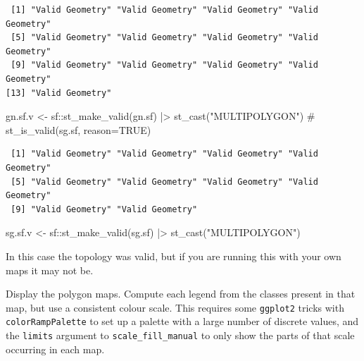 \documentclass[
  letterpaper,
  DIV=11,
  numbers=noendperiod]{scrartcl}
\newenvironment{Shaded}{\begin{snugshade}}{\end{snugshade}}
\newcommand{\AttributeTok}[1]{\textcolor[rgb]{0.40,0.45,0.13}{#1}}
\newcommand{\CommentTok}[1]{\textcolor[rgb]{0.37,0.37,0.37}{#1}}
\newcommand{\ConstantTok}[1]{\textcolor[rgb]{0.56,0.35,0.01}{#1}}
\newcommand{\FunctionTok}[1]{\textcolor[rgb]{0.28,0.35,0.67}{#1}}
\newcommand{\NormalTok}[1]{\textcolor[rgb]{0.00,0.23,0.31}{#1}}
\newcommand{\OtherTok}[1]{\textcolor[rgb]{0.00,0.23,0.31}{#1}}
\newcommand{\SpecialCharTok}[1]{\textcolor[rgb]{0.37,0.37,0.37}{#1}}
\newcommand{\StringTok}[1]{\textcolor[rgb]{0.13,0.47,0.30}{#1}}
\begin{document}
\begin{verbatim}
 [1] "Valid Geometry" "Valid Geometry" "Valid Geometry" "Valid Geometry"
 [5] "Valid Geometry" "Valid Geometry" "Valid Geometry" "Valid Geometry"
 [9] "Valid Geometry" "Valid Geometry" "Valid Geometry" "Valid Geometry"
[13] "Valid Geometry"
\end{verbatim}

\begin{Shaded}
\begin{Highlighting}[]
\NormalTok{gn.sf.v }\OtherTok{\textless{}{-}}\NormalTok{ sf}\SpecialCharTok{::}\FunctionTok{st\_make\_valid}\NormalTok{(gn.sf)  }\SpecialCharTok{|\textgreater{}} \FunctionTok{st\_cast}\NormalTok{(}\StringTok{"MULTIPOLYGON"}\NormalTok{)}
\CommentTok{\#}
\FunctionTok{st\_is\_valid}\NormalTok{(sg.sf, }\AttributeTok{reason=}\ConstantTok{TRUE}\NormalTok{)}
\end{Highlighting}
\end{Shaded}

\begin{verbatim}
 [1] "Valid Geometry" "Valid Geometry" "Valid Geometry" "Valid Geometry"
 [5] "Valid Geometry" "Valid Geometry" "Valid Geometry" "Valid Geometry"
 [9] "Valid Geometry" "Valid Geometry"
\end{verbatim}

\begin{Shaded}
\begin{Highlighting}[]
\NormalTok{sg.sf.v }\OtherTok{\textless{}{-}}\NormalTok{ sf}\SpecialCharTok{::}\FunctionTok{st\_make\_valid}\NormalTok{(sg.sf)  }\SpecialCharTok{|\textgreater{}} \FunctionTok{st\_cast}\NormalTok{(}\StringTok{"MULTIPOLYGON"}\NormalTok{)}
\end{Highlighting}
\end{Shaded}

In this case the topology was valid, but if you are running this with
your own maps it may not be.

Display the polygon maps. Compute each legend from the classes present
in that map, but use a consistent colour scale. This requires some
\texttt{ggplot2} tricks with \texttt{colorRampPalette} to set up a
palette with a large number of discrete values, and the \texttt{limits}
argument to \texttt{scale\_fill\_manual} to only show the parts of that
scale occurring in each map.
\end{document}
